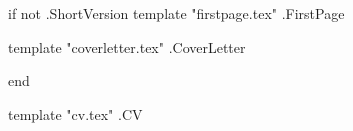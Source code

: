 \documentclass[11pt]{article}
\begin{document}
\normalfont

%
%
%
%

{{if not .ShortVersion}}
	{{template "firstpage.tex" .FirstPage}}

	\newpage

	{{template "coverletter.tex" .CoverLetter}}

	\newpage
{{end}}

{{template "cv.tex" .CV}}
\end{document}
